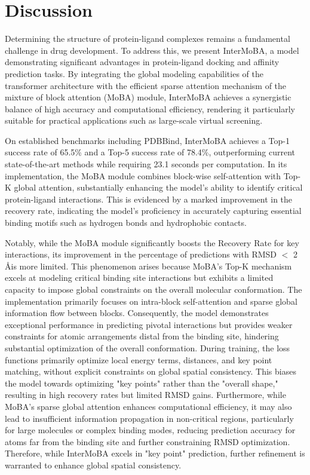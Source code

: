 \documentclass[lettersize,journal]{IEEEtran}
\begin{document}
\section{Discussion}
Determining the structure of protein-ligand complexes remains a fundamental challenge in drug development. To address this, we present InterMoBA, a model demonstrating significant advantages in protein-ligand docking and affinity prediction tasks. By integrating the global modeling capabilities of the transformer\cite{vaswani2017attention} architecture with the efficient sparse attention mechanism of the mixture of block attention (MoBA) module, InterMoBA achieves a synergistic balance of high accuracy and computational efficiency, rendering it particularly suitable for practical applications such as large-scale virtual screening.

On established benchmarks including PDBBind, InterMoBA achieves a Top-1 success rate of 65.5\% and a Top-5 success rate of 78.4\%, outperforming current state-of-the-art methods while requiring 23.1 seconds per computation. In its implementation, the MoBA module combines block-wise self-attention with Top-K global attention, substantially enhancing the model's ability to identify critical protein-ligand interactions. This is evidenced by a marked improvement in the recovery rate, indicating the model's proficiency in accurately capturing essential binding motifs such as hydrogen bonds and hydrophobic contacts.

Notably, while the MoBA module significantly boosts the Recovery Rate for key interactions, its improvement in the percentage of predictions with RMSD $<$ 2 \AA is more limited. This phenomenon arises because MoBA's Top-K mechanism excels at modeling critical binding site interactions but exhibits a limited capacity to impose global constraints on the overall molecular conformation. The implementation primarily focuses on intra-block self-attention and sparse global information flow between blocks. Consequently, the model demonstrates exceptional performance in predicting pivotal interactions but provides weaker constraints for atomic arrangements distal from the binding site, hindering substantial optimization of the overall conformation. During training, the loss functions primarily optimize local energy terms, distances, and key point matching, without explicit constraints on global spatial consistency. This biases the model towards optimizing "key points" rather than the "overall shape," resulting in high recovery rates but limited RMSD gains. Furthermore, while MoBA's sparse global attention enhances computational efficiency, it may also lead to insufficient information propagation in non-critical regions, particularly for large molecules or complex binding modes, reducing prediction accuracy for atoms far from the binding site and further constraining RMSD optimization. Therefore, while InterMoBA excels in "key point" prediction, further refinement is warranted to enhance global spatial consistency.
\end{document}
